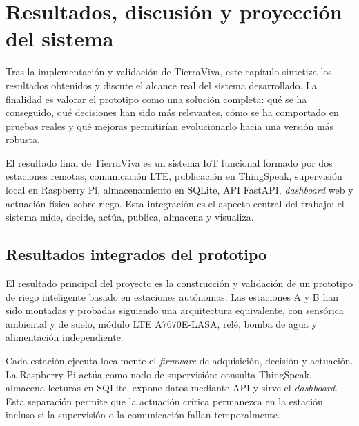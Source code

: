 \chapter{Resultados, discusión y proyección del sistema}
\label{cap:resultados_discusion_conclusiones}

Tras la implementación y validación de TierraViva, este capítulo sintetiza los resultados obtenidos y discute el alcance real del sistema desarrollado. La finalidad es valorar el prototipo como una solución completa: qué se ha conseguido, qué decisiones han sido más relevantes, cómo se ha comportado en pruebas reales y qué mejoras permitirían evolucionarlo hacia una versión más robusta.

El resultado final de TierraViva es un sistema IoT funcional formado por dos estaciones remotas, comunicación LTE, publicación en ThingSpeak, supervisión local en Raspberry Pi, almacenamiento en SQLite, API FastAPI, \textit{dashboard} web y actuación física sobre riego. Esta integración es el aspecto central del trabajo: el sistema mide, decide, actúa, publica, almacena y visualiza.

\section{Resultados integrados del prototipo}
\label{sec:resultados_integrados}

El resultado principal del proyecto es la construcción y validación de un prototipo de riego inteligente basado en estaciones autónomas. Las estaciones A y B han sido montadas y probadas siguiendo una arquitectura equivalente, con sensórica ambiental y de suelo, módulo LTE A7670E-LASA, relé, bomba de agua y alimentación independiente.

Cada estación ejecuta localmente el \textit{firmware} de adquisición, decisión y actuación. La Raspberry Pi actúa como nodo de supervisión: consulta ThingSpeak, almacena lecturas en SQLite, expone datos mediante API y sirve el \textit{dashboard}. Esta separación permite que la actuación crítica permanezca en la estación incluso si la supervisión o la comunicación fallan temporalmente.

